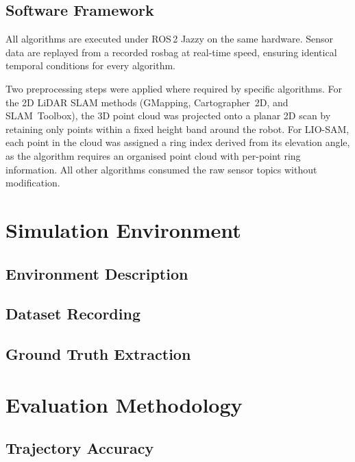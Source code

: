 \subsection{Software Framework}

All algorithms are executed under ROS\,2 Jazzy on the same hardware.
Sensor data are replayed from a recorded rosbag at real-time speed, ensuring
identical temporal conditions for every algorithm.

Two preprocessing steps were applied where required by specific algorithms.
For the 2D LiDAR SLAM methods (GMapping, Cartographer~2D, and SLAM~Toolbox),
the 3D point cloud was projected onto a planar 2D scan by retaining only points
within a fixed height band around the robot.
For LIO-SAM, each point in the cloud was assigned a ring index derived from its
elevation angle, as the algorithm requires an organised point cloud with
per-point ring information.
All other algorithms consumed the raw sensor topics without modification.

\section{Simulation Environment}

\subsection{Environment Description}

\subsection{Dataset Recording}

\subsection{Ground Truth Extraction}

\section{Evaluation Methodology}

\subsection{Trajectory Accuracy}

